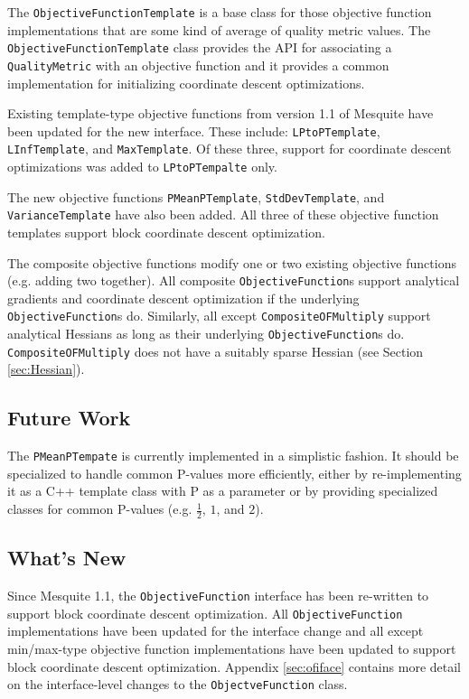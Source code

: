 \documentclass{article}
\begin{document}
The \texttt{ObjectiveFunctionTemplate} is a base class for those objective function implementations that are some kind of average of quality metric values.  The \texttt{ObjectiveFunctionTemplate} class provides the API for associating a \texttt{QualityMetric} with an objective function and it provides a common implementation for initializing coordinate descent optimizations.

Existing template-type objective functions from version 1.1 of Mesquite have been updated for the new interface.  These include: \texttt{LPtoPTemplate}, \texttt{LInfTemplate}, and \texttt{MaxTemplate}.  Of these three, support for coordinate descent optimizations was added to \texttt{LPtoPTempalte} only.

The new objective functions \texttt{PMeanPTemplate}, \texttt{StdDevTemplate}, and \texttt{VarianceTemplate} have also been added.  All three of these objective function templates support block coordinate descent optimization.   

The composite objective functions modify one or two existing objective functions (e.g. adding two together).  All composite \texttt{ObjectiveFunction}s support analytical gradients and coordinate descent optimization if the underlying \texttt{ObjectiveFunction}s do.  Similarly, all except \texttt{CompositeOFMultiply} support analytical Hessians as long as their underlying \texttt{ObjectiveFunction}s do.  \texttt{CompositeOFMultiply} does not have a suitably sparse Hessian (see Section \ref{sec:Hessian}).

\subsection{Future Work}

The \texttt{PMeanPTempate} is currently implemented in a simplistic fashion.  It should be specialized to handle common P-values more efficiently, either by re-implementing it as a C++ template class with P as a parameter or by providing specialized classes for common P-values (e.g. $\frac{1}{2}$, $1$, and $2$).

\subsection{What's New}

Since Mesquite 1.1, the \texttt{ObjectiveFunction} interface has been re-written to support block coordinate descent optimization.  All \texttt{ObjectiveFunction} implementations have been updated for the interface change and all except min/max-type objective function implementations have been updated to support block coordinate descent optimization.  Appendix \ref{sec:ofiface} contains more detail on the interface-level changes to the \texttt{ObjectveFunction} class.
\end{document}
